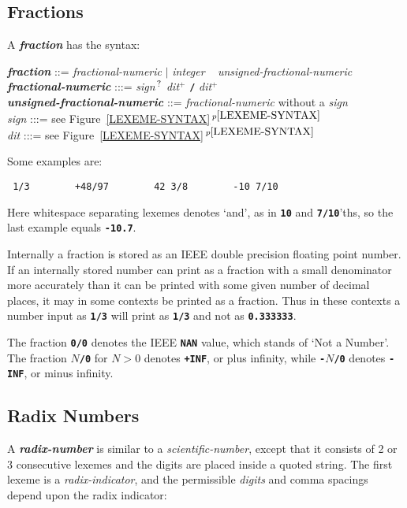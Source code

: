 \documentclass[12pt]{article}
\newcommand{\TT}[1]{{\tt \bfseries #1}}
\newcommand{\ttkey}[1]{{\tt \bfseries #1}}
\newcommand{\emkey}[1]{{\em \bfseries #1}}
\newcommand{\itemref}[1]{\ref{#1}$\,^{p\pageref{#1}}$}
\newcommand{\PLUS}[1][]{{$^{+#1}$}}
\newcommand{\QMARK}{{$^{\,\mbox{\footnotesize ?}}$}}
\newenvironment{indpar}[1][0.3in]%
	{\begin{list}{}%
		     {\setlength{\itemsep}{0in}%
		      \setlength{\topsep}{0in}%
		      \setlength{\parsep}{1ex}%
		      \setlength{\labelwidth}{#1}%
		      \setlength{\leftmargin}{#1}%
		      \addtolength{\leftmargin}{\labelsep}}%
	 \item}%
	{\end{list}}
\begin{document}
\subsection{Fractions}
\label{FRACTIONS}

A \emkey{fraction} has the syntax:

\begin{indpar}
\emkey{fraction}\label{FRACTION}
    ::= {\em fractional-numeric} $|$
        {\em integer} ~ {\em unsigned-fractional-numeric}
\\
\emkey{fractional-numeric} :::=
    {\em sign}\QMARK{} {\em dit}\PLUS{} \TT{/} {\em dit}\PLUS{}
\\
\emkey{unsigned-fractional-numeric} ::=
    {\em fractional-numeric} without a {\em sign}
\\[0.5ex]
{\em sign} :::= see Figure~\itemref{LEXEME-SYNTAX} \\
{\em dit} :::= see Figure~\itemref{LEXEME-SYNTAX}
\end{indpar}

Some examples are:
\begin{center}
\tt
1/3 ~~~~~~ +48/97 ~~~~~~ 42~3/8 ~~~~~~ -10~7/10
\end{center}
Here whitespace separating lexemes denotes `and',
as in \TT{10} and \TT{7/10}'ths,
so the last example equals \TT{-10.7}.

Internally a fraction is stored as an IEEE double precision floating
point number.  If an internally stored number can print as a fraction
with a small denominator more accurately than it can be printed with
some given number of decimal places, it may in some contexts be
printed as a fraction.  Thus in these contexts a number input as
\TT{1/3} will print as \TT{1/3} and not as \TT{0.333333}.

The fraction \TT{0/0}\label{0/0} denotes the IEEE \ttkey{NAN} value, which
stands of `Not a Number'.  The fraction \TT{$N$/0} for $N>0$
denotes \TT{+INF}, or plus infinity, while \TT{-$N$/0} denotes
\TT{-INF}, or minus infinity.

\subsection{Radix Numbers}
\label{RADIX-NUMBER}

A \emkey{radix-number} is similar to a {\em scientific-number},
except that it consists of 2 or 3 consecutive lexemes and the
digits are placed inside a quoted string.  The first lexeme is
a {\em radix-indicator}, and the
permissible {\em digits} and comma spacings depend upon the radix indicator:
\end{document}
